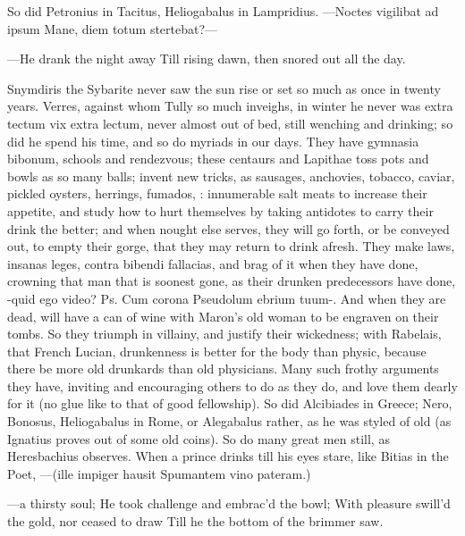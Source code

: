{{So did Petronius in Tacitus, Heliogabalus in Lampridius.
---Noctes vigilibat ad ipsum
Mane, diem totum stertebat?---

---He drank the night away
Till rising dawn, then snored out all the day.

Snymdiris the Sybarite never saw the sun rise or set so much as once in
twenty years. Verres, against whom Tully so much inveighs, in winter he
never was extra tectum vix extra lectum, never almost out of bed,
 still wenching and drinking; so did he spend his time, and so do
myriads in our days. They have gymnasia bibonum, schools and
rendezvous; these centaurs and Lapithae toss pots and bowls as so many
balls; invent new tricks, as sausages, anchovies, tobacco, caviar,
pickled oysters, herrings, fumados, \etc{}: innumerable salt meats to
increase their appetite, and study how to hurt themselves by taking
antidotes to carry their drink the better; and when nought
else serves, they will go forth, or be conveyed out, to empty their
gorge, that they may return to drink afresh. They make laws, insanas
leges, contra bibendi fallacias, and brag of it when they have
done, crowning that man that is soonest gone, as their drunken
predecessors have done, -quid ego video? Ps. Cum corona Pseudolum
ebrium tuum-. And when they are dead, will have a can of wine with
Maron's old woman to be engraven on their tombs. So they triumph
in villainy, and justify their wickedness; with Rabelais, that French
Lucian, drunkenness is better for the body than physic, because there
be more old drunkards than old physicians. Many such frothy arguments
they have, inviting and encouraging others to do as they do, and
love them dearly for it (no glue like to that of good fellowship). So
did Alcibiades in Greece; Nero, Bonosus, Heliogabalus in Rome, or
Alegabalus rather, as he was styled of old (as Ignatius proves
out of some old coins). So do many great men still, as
Heresbachius observes. When a prince drinks till his eyes stare,
like Bitias in the Poet,
---(ille impiger hausit
Spumantem vino pateram.)

---a thirsty soul;
He took challenge and embrac'd the bowl;
With pleasure swill'd the gold, nor ceased to draw
Till he the bottom of the brimmer saw.

}}
